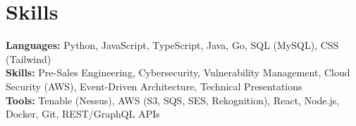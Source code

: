 \documentclass[11pt]{article}       %
\begin{document}

\vspace{-18.5pt}


\section*{Skills}
\textbf{Languages:} Python, JavaScript, TypeScript, Java, Go, SQL (MySQL), CSS (Tailwind)\\
\textbf{Skills:} Pre-Sales Engineering, Cybersecurity, Vulnerability Management, Cloud Security (AWS), Event-Driven Architecture, Technical Presentations\\
\textbf{Tools:} Tenable (Nessus), AWS (S3, SQS, SES, Rekognition), React, Node.js, Docker, Git, REST/GraphQL APIs\\

\vspace{-6.5pt}
\end{document}
